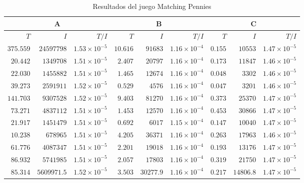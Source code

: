 \begin{table}[ht]
\scriptsize
    \centering
    \begin{tabular}{r r r | r r r | r r r}
    \multicolumn{3}{c}{A} & \multicolumn{3}{c}{B} & \multicolumn{3}{c}{C} \\ \hline
    $T$ & $I$ & $T/I$ & $T$ & $I$ & $T/I$ & $T$ & $I$ & $T/I$ \\  \hline
    $375.559$ & $24597798$ & $1.53 {\times} 10 ^{-5}$ & $10.616$ & $91683$ & $1.16 {\times} 10 ^{-4}$ & $0.155$ & $10553$ & $1.47 {\times} 10 ^{-5}$ \\
    $20.442$ & $1349708$ & $1.51 {\times} 10 ^{-5}$ & $2.407$ & $20797$ & $1.16 {\times} 10 ^{-4}$ & $0.173$ & $11847$ & $1.46 {\times} 10 ^{-5}$ \\
    $22.030$ & $1455882$ & $1.51 {\times} 10 ^{-5}$ & $1.465$ & $12674$ & $1.16 {\times} 10 ^{-4}$ & $0.048$ & $3302$ & $1.46 {\times} 10 ^{-5}$ \\
    $39.273$ & $2591911$ & $1.52 {\times} 10 ^{-5}$ & $0.529$ & $4576$ & $1.16 {\times} 10 ^{-4}$ & $0.047$ & $3201$ & $1.46 {\times} 10 ^{-5}$ \\
    $141.703$ & $9307528$ & $1.52 {\times} 10 ^{-5}$ & $9.403$ & $81270$ & $1.16 {\times} 10 ^{-4}$ & $0.373$ & $25370$ & $1.47 {\times} 10 ^{-5}$ \\
    $73.271$ & $4837112$ & $1.51 {\times} 10 ^{-5}$ & $1.453$ & $12570$ & $1.16 {\times} 10 ^{-4}$ & $0.453$ & $30866$ & $1.47 {\times} 10 ^{-5}$ \\
    $21.917$ & $1451479$ & $1.51 {\times} 10 ^{-5}$ & $0.692$ & $6017$ & $1.15 {\times} 10 ^{-4}$ & $0.147$ & $10040$ & $1.47 {\times} 10 ^{-5}$ \\
    $10.238$ & $678965$ & $1.51 {\times} 10 ^{-5}$ & $4.205$ & $36371$ & $1.16 {\times} 10 ^{-4}$ & $0.263$ & $17963$ & $1.46 {\times} 10 ^{-5}$ \\
    $61.776$ & $4087347$ & $1.51 {\times} 10 ^{-5}$ & $2.201$ & $19018$ & $1.16 {\times} 10 ^{-4}$ & $0.193$ & $13176$ & $1.47 {\times} 10 ^{-5}$ \\
    $86.932$ & $5741985$ & $1.51 {\times} 10 ^{-5}$ & $2.057$ & $17803$ & $1.16 {\times} 10 ^{-4}$ & $0.319$ & $21750$ & $1.47 {\times} 10 ^{-5}$ \\ \hline
    $85.314$ & $5609971.5$ & $1.52 {\times} 10 ^{-5}$ & $3.503$ & $30277.9$ & $1.16 {\times} 10 ^{-4}$ & $0.217$ & $14806.8$ & $1.47 {\times} 10 ^{-5}$ \\ \hline
    \end{tabular}
    \caption{Resultados del juego Matching Pennies}
    \label{tab:resultados-matching-pennies}
\end{table}

